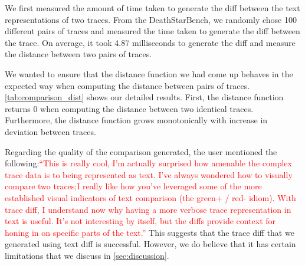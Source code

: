  We first measured the amount of time taken to generate the diff between the text representations
of two traces. From the DeathStarBench, we randomly chose 100 different pairs of traces and measured the time taken
to generate the diff between the trace. On average, it took 4.87 milliseconds to generate the diff and measure the distance
between two pairs of traces.

 We wanted to ensure that the distance function we had come up behaves in the expected way
when computing the distance between pairs of traces. \autoref{tab:comparison_dist} shows our detailed results. First,
the distance function returns 0 when computing the distance between two identical traces. Furthermore, the distance function
grows monotonically with increase in deviation between traces. 

 Regarding the quality of the comparison generated, the user mentioned the following:\textcolor{red}{``This is really cool, I'm actually 
surprised how amenable the complex trace data is to being represented as text.  I've always wondered how to visually compare two traces;I 
really like how you've leveraged some of the more established visual indicators of text comparison (the green+ / red- idiom). With trace diff,
I understand now why having a more verbose trace representation in text is useful.  It's not interesting by itself, but the diffs provide 
context for honing in on specific parts of the text.''} This suggests that the trace diff that we generated using text diff is successful.
However, we do believe that it has certain limitations that we discuss in \autoref{sec:discussion}.
